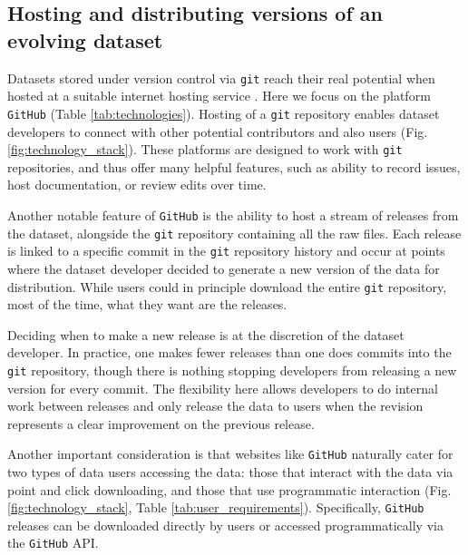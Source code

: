 \documentclass[a4paper,num-refs]{oup-contemporary}
\begin{document}
\subsection{Hosting and distributing versions of an evolving dataset}

Datasets stored under version control via \texttt{git} reach their real potential when hosted at a suitable internet hosting service \cite{Ram-2013,Perkel-2016}. Here we focus on the platform \texttt{GitHub} (Table \ref{tab:technologies}). Hosting of a \texttt{git} repository enables dataset developers to connect with other potential contributors and also users (Fig. \ref{fig:technology_stack}). These platforms are designed to work with \texttt{git} repositories, and thus offer many helpful features, such as ability to record issues, host documentation, or review edits over time.

Another notable feature of \texttt{GitHub} is the ability to host a stream of releases from the dataset, alongside the \texttt{git} repository containing all the raw files. Each release is linked to a specific commit in the \texttt{git} repository history and occur at points where the dataset developer decided to generate a new version of the data for distribution. While users could in principle download the entire \texttt{git} repository, most of the time, what they want are the releases.

Deciding when to make a new release is at the discretion of the dataset developer. In practice, one makes fewer releases than one does commits into the \texttt{git} repository, though there is nothing stopping developers from releasing a new version for every commit. The flexibility here allows developers to do internal work between releases and only release the data to users when the revision represents a clear improvement on the previous release.

Another important consideration is that websites like \texttt{GitHub} naturally cater for two types of data users accessing the data: those that interact with the data via point and click downloading, and those that use programmatic interaction (Fig. \ref{fig:technology_stack}, Table \ref{tab:user_requirements}). Specifically, \texttt{GitHub} releases can be downloaded directly by users or accessed programmatically via the \texttt{GitHub} API.
\end{document}
